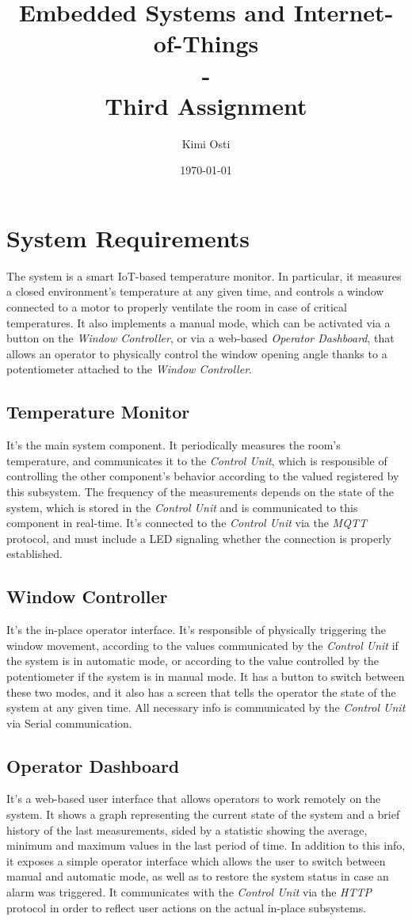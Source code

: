 \documentclass[a4paper,12pt]{report}
\title{Embedded Systems and Internet-of-Things \\ - \\ Third Assignment}
\author{Kimi Osti}
\date{\today}
\begin{document}
	
	\maketitle
	\tableofcontents
	
	\chapter{System Requirements}
	The system is a smart IoT-based temperature monitor. In particular, it measures a closed environment's temperature at any given time, and controls a window connected to a motor to properly ventilate the room in case of critical temperatures. It also implements a manual mode, which can be activated via a button on the \textit{Window Controller}, or via a web-based \textit{Operator Dashboard}, that allows an operator to physically control the window opening angle thanks to a potentiometer attached to the \textit{Window Controller}.
	\section{Temperature Monitor}
	It's the main system component. It periodically measures the room's temperature, and communicates it to the \textit{Control Unit}, which is responsible of controlling the other component's behavior according to the valued registered by this subsystem. The frequency of the measurements depends on the state of the system, which is stored in the \textit{Control Unit} and is communicated to this component in real-time. It's connected to the \textit{Control Unit} via the \textit{MQTT} protocol, and must include a LED signaling whether the connection is properly established.
	\section{Window Controller}
	It's the in-place operator interface. It's responsible of physically triggering the window movement, according to the values communicated by the \textit{Control Unit} if the system is in automatic mode, or according to the value controlled by the potentiometer if the system is in manual mode. It has a button to switch between these two modes, and it also has a screen that tells the operator the state of the system at any given time. All necessary info is communicated by the \textit{Control Unit} via Serial communication.
	\section{Operator Dashboard}
	It's a web-based user interface that allows operators to work remotely on the system. It shows a graph representing the current state of the system and a brief history of the last measurements, sided by a statistic showing the average, minimum and maximum values in the last period of time. In addition to this info, it exposes a simple operator interface which allows the user to switch between manual and automatic mode, as well as to restore the system status in case an alarm was triggered. It communicates with the \textit{Control Unit} via the \textit{HTTP} protocol in order to reflect user actions on the actual in-place subsystems.
\end{document}
